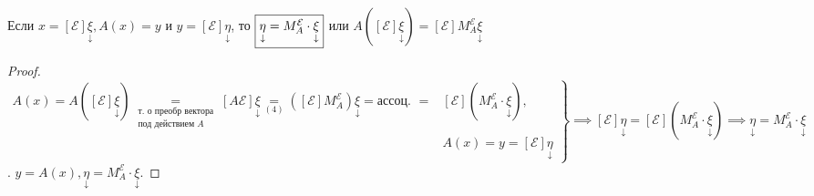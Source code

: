 \documentclass[../main.tex]{subfiles}
\begin{document}
\begin{theorem}[]
    Если $x=[\mathcal{E}]\underset{\downarrow}{\xi}, A(x)=y$ и $y = [\mathcal{E}]\underset{\downarrow}{\eta}$, то $\fbox{$\underset{\downarrow}{\eta} = M_{A}^{\mathcal{E}}\cdot \underset{\downarrow}{\xi}$}$ или $A([\mathcal{E}]\underset{\downarrow}{\xi})=[\mathcal{E}]M_{A}^{\mathcal{E}}\underset{\downarrow}{\xi}$ 
\end{theorem}
\vspace{0.5cm}
\begin{proof}
    $\left.\begin{aligned}A(x) = A([\mathcal{E}]\underset{\downarrow}{\xi})  \underset{\substack{\text{т. о преобр вектора} \\ \text{под действием $A$}}}{=} [A\mathcal{E}]\underset{\downarrow}{\xi} \underset{(4)}{=} ([\mathcal{E}] M_{A}^{\mathcal{E}})\underset{\downarrow}{\xi}=
     \text{ассоц. }= &[\mathcal{E}](M_{A}^{\mathcal{E}}\cdot \underset{\downarrow}{\xi}),\\ 
         &A(x)=y= [\mathcal{E}]\underset{\downarrow}{\eta}\end{aligned}\right\} \implies [\mathcal{E}]\underset{\downarrow}{\eta}= [\mathcal{E}](M_{A}^{\mathcal{E}}\cdot \underset{\downarrow}{\xi}) \implies \underset{\downarrow}{\eta} = M_{A}^{\mathcal{E}}\cdot \underset{\downarrow}{\xi}$. $y=A(x), \underset{\downarrow}{\eta} = M_{A}^{\mathcal{E}}\cdot \underset{\downarrow}{\xi}$.
\end{proof}
\end{document}
